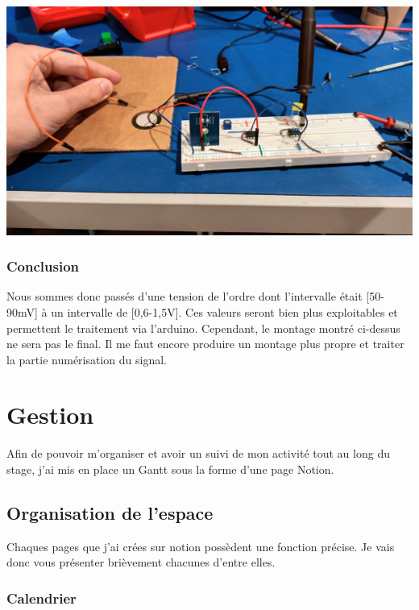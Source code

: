 \documentclass[11pt,french,a4paper]{article}
\begin{document}
\begin{center}	
\includegraphics[scale=0.1]{../img/froty.jpg}
\label{M}
\end{center}

\subsubsection{Conclusion}
Nous sommes donc passés d’une tension de l’ordre dont l’intervalle était [50-90mV] à un intervalle de [0,6-1,5V]. Ces valeurs seront bien plus exploitables et permettent le traitement via l’arduino.
Cependant, le montage montré ci-dessus ne sera pas le final. Il me faut encore produire un montage plus propre et traiter la partie numérisation du signal.

\newpage
\section{Gestion}
Afin de pouvoir m'organiser et avoir un suivi de mon activité tout au long du stage, j'ai mis en place un Gantt sous la forme d'une page Notion.

\subsection{Organisation de l'espace }
Chaques pages que j'ai crées sur notion possèdent une fonction précise. Je vais donc vous présenter brièvement chacunes d'entre elles.
\subsubsection{Calendrier}
\end{document}
